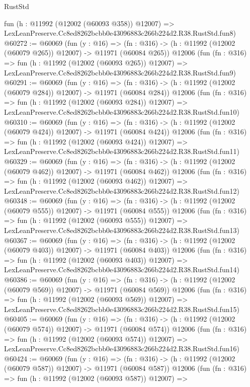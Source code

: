\begin{lexlean}{RustStd}
\begin{coremodule}
    fun (h : @11992 (@12002 (@60093 @358)) @12007) =>
    LexLeanPreserve.Cc8ed8262bcbb0e43096883c266b224d2.R38.RustStd.fun8)
@60272 := @60069
    (fun (y : @16) =>
    (fn : @316) -> (h : @11992 (@12002 (@60079 @265)) @12007) -> @11971 (@60084 @265))
    @12006
    (fun (fn : @316) =>
    fun (h : @11992 (@12002 (@60093 @265)) @12007) =>
    LexLeanPreserve.Cc8ed8262bcbb0e43096883c266b224d2.R38.RustStd.fun9)
@60291 := @60069
    (fun (y : @16) =>
    (fn : @316) -> (h : @11992 (@12002 (@60079 @284)) @12007) -> @11971 (@60084 @284))
    @12006
    (fun (fn : @316) =>
    fun (h : @11992 (@12002 (@60093 @284)) @12007) =>
    LexLeanPreserve.Cc8ed8262bcbb0e43096883c266b224d2.R38.RustStd.fun10)
@60310 := @60069
    (fun (y : @16) =>
    (fn : @316) -> (h : @11992 (@12002 (@60079 @424)) @12007) -> @11971 (@60084 @424))
    @12006
    (fun (fn : @316) =>
    fun (h : @11992 (@12002 (@60093 @424)) @12007) =>
    LexLeanPreserve.Cc8ed8262bcbb0e43096883c266b224d2.R38.RustStd.fun11)
@60329 := @60069
    (fun (y : @16) =>
    (fn : @316) -> (h : @11992 (@12002 (@60079 @462)) @12007) -> @11971 (@60084 @462))
    @12006
    (fun (fn : @316) =>
    fun (h : @11992 (@12002 (@60093 @462)) @12007) =>
    LexLeanPreserve.Cc8ed8262bcbb0e43096883c266b224d2.R38.RustStd.fun12)
@60348 := @60069
    (fun (y : @16) =>
    (fn : @316) -> (h : @11992 (@12002 (@60079 @555)) @12007) -> @11971 (@60084 @555))
    @12006
    (fun (fn : @316) =>
    fun (h : @11992 (@12002 (@60093 @555)) @12007) =>
    LexLeanPreserve.Cc8ed8262bcbb0e43096883c266b224d2.R38.RustStd.fun13)
@60367 := @60069
    (fun (y : @16) =>
    (fn : @316) -> (h : @11992 (@12002 (@60079 @403)) @12007) -> @11971 (@60084 @403))
    @12006
    (fun (fn : @316) =>
    fun (h : @11992 (@12002 (@60093 @403)) @12007) =>
    LexLeanPreserve.Cc8ed8262bcbb0e43096883c266b224d2.R38.RustStd.fun14)
@60386 := @60069
    (fun (y : @16) =>
    (fn : @316) -> (h : @11992 (@12002 (@60079 @569)) @12007) -> @11971 (@60084 @569))
    @12006
    (fun (fn : @316) =>
    fun (h : @11992 (@12002 (@60093 @569)) @12007) =>
    LexLeanPreserve.Cc8ed8262bcbb0e43096883c266b224d2.R38.RustStd.fun15)
@60405 := @60069
    (fun (y : @16) =>
    (fn : @316) -> (h : @11992 (@12002 (@60079 @574)) @12007) -> @11971 (@60084 @574))
    @12006
    (fun (fn : @316) =>
    fun (h : @11992 (@12002 (@60093 @574)) @12007) =>
    LexLeanPreserve.Cc8ed8262bcbb0e43096883c266b224d2.R38.RustStd.fun16)
@60424 := @60069
    (fun (y : @16) =>
    (fn : @316) -> (h : @11992 (@12002 (@60079 @587)) @12007) -> @11971 (@60084 @587))
    @12006
    (fun (fn : @316) =>
    fun (h : @11992 (@12002 (@60093 @587)) @12007) =>

\end{coremodule}
\end{lexlean}
